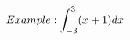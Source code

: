 \documentclass[preview]{standalone}
\begin{document}
\begin{align*}
\special{dvisvgm:raw <g id='unique000'>}Example: \int_{-3}^{3} (x+1) dx\special{dvisvgm:raw </g>}
\end{align*}
\end{document}
